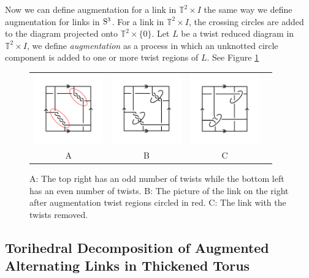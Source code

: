\documentclass[11pt]{amsart}
\newcommand{\Sp}{{\rm{S}}}
\newcommand{\torus}{{\mathbb{T}^2}}
\theoremstyle{plain}
\theoremstyle{definition}
\begin{document}
Now we can define augmentation for a link in $\torus \times I$ the same way we define augmentation for links in $\Sp^3$. For a link in $\torus \times I$, the crossing circles are added to the diagram projected onto $\torus \times \{0\}$. Let $L$ be a twist reduced diagram in $\torus \times I$, we define {\it augmentation} as a process in which an unknotted circle component is added to one or more twist regions of $L$. See Figure \ref{fig:Augmentations}


 \begin{figure}
 \centering
 \begin{tabular}{cccc}
 \includegraphics [width=3cm]{fig1}&
 \includegraphics  [width=3cm]{twist-augment}&
  \includegraphics [width=3cm]{fig-2}\\
  A&B&C
  \end{tabular}
 \caption{A: The top right has an odd number of twists while the bottom left has an even number of twists. B: The picture of the link on the right after augmentation twist regions circled in red. C: The link with the twists removed.}
 \label{fig:Augmentations}
 \end{figure}

\subsection{Torihedral Decomposition of Augmented Alternating Links in Thickened Torus}
\end{document}
